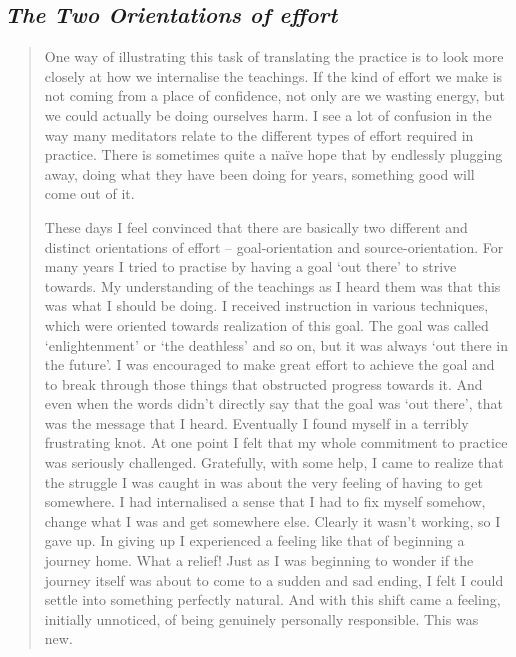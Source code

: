 \hypertarget{the-two-orientations-of-effort}{%
\subsection{\texorpdfstring{\emph{The Two Orientations of
effort}}{The Two Orientations of effort}}\label{the-two-orientations-of-effort}}

\begin{quote}
One way of illustrating this task of translating the practice is to look
more closely at how we internalise the teachings. If the kind of effort
we make is not coming from a place of confidence, not only are we
wasting energy, but we could actually be doing ourselves harm. I see a
lot of confusion in the way many meditators relate to the different
types of effort required in practice. There is sometimes quite a naïve
hope that by endlessly plugging away, doing what they have been doing
for years, something good will come out of it.

These days I feel convinced that there are basically two different and
distinct orientations of effort -- goal-orientation and
source-orientation. For many years I tried to practise by having a goal
`out there' to strive towards. My understanding of the teachings as I
heard them was that this was what I should be doing. I received
instruction in various techniques, which were oriented towards
realization of this goal. The goal was called `enlightenment' or `the
deathless' and so on, but it was always `out there in the future'. I was
encouraged to make great effort to achieve the goal and to break through
those things that obstructed progress towards it. And even when the
words didn't directly say that the goal was `out there', that was the
message that I heard. Eventually I found myself in a terribly
frustrating knot. At one point I felt that my whole commitment to
practice was seriously challenged. Gratefully, with some help, I came to
realize that the struggle I was caught in was about the very feeling of
having to get somewhere. I had internalised a sense that I had to fix
myself somehow, change what I was and get somewhere else. Clearly it
wasn't working, so I gave up. In giving up I experienced a feeling like
that of beginning a journey home. What a relief! Just as I was beginning
to wonder if the journey itself was about to come to a sudden and sad
ending, I felt I could settle into something perfectly natural. And with
this shift came a feeling, initially unnoticed, of being genuinely
personally responsible. This was new.


\end{quote}

